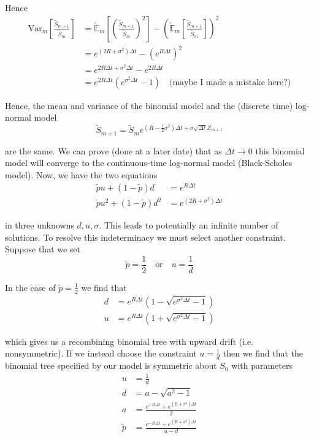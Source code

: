 \documentclass[12pt]{article}
\newlength\tindent
\renewcommand{\indent}{\hspace*{\tindent}}
\newcommand{\E}{\mathbb E}
\newcommand{\Var}{\mathrm{Var}}
\begin{document}
Hence
\begin{align*}
	\Var_m\left[ \frac{\tilde{S}_{m + 1}}{\tilde{S}_m} \right] &= \tilde{\E}_m \left[ \left( \frac{\tilde{S}_{m + 1}}{\tilde{S}_m} \right)^2 \right] - \left( \tilde{\E}_m \left[ \frac{\tilde{S}_{m + 1}}{\tilde{S}_m} \right] \right)^2 \\
	&= e^{(2R + \sigma^2)\Delta t} - \left(e^{R\Delta t}\right)^2 \\
	&= e^{2R\Delta t + \sigma^2\Delta t} - e^{2R\Delta t} \\
	&= e^{2R\Delta t}(e^{\sigma^2\Delta t} - 1) \quad \text{(maybe I made a mistake here?)}
\end{align*}

\indent Hence, the mean and variance of the binomial model and the (discrete time) log-normal model
\begin{equation*}
	\tilde{S}_{m + 1} = \tilde{S}_m e^{(R - \frac{1}{2}\sigma^2)\Delta t + \sigma\sqrt{\Delta t}Z_{m + 1}}
\end{equation*}

are the same. We can prove (done at a later date) that as $\Delta t\to 0$ this binomial model will converge to the continuous-time log-normal model (Black-Scholes model). Now, we have the two equations
\begin{align*}
	\tilde{p}u + (1 - \tilde{p})d &= e^{R\Delta t} \\
	\tilde{p}u^2 + (1 - \tilde{p})d^2 &= e^{(2R + \sigma^2)\Delta t}
\end{align*}

in three unknowns $d,u,\sigma$. This leads to potentially an infinite number of solutions. To resolve this indeterminacy we must select another constraint. Suppose that we set
\begin{equation*}
	\tilde{p} = \frac{1}{2} \quad \text{or} \quad u = \frac{1}{d}
\end{equation*}

In the case of $\tilde{p} = \frac{1}{2}$ we find that
\begin{align*}
	d &= e^{R\Delta t}\left(1 - \sqrt{e^{\sigma^2\Delta t} - 1}\right) \\
	u &= e^{R\Delta t}\left(1 + \sqrt{e^{\sigma^2\Delta t} - 1}\right)
\end{align*}

which gives us a recombining binomial tree with upward drift (i.e. nonsymmetric). If we instead choose the constraint $u = \frac{1}{d}$ then we find that the binomial tree specified by our model is symmetric about $S_0$ with parameters
\begin{align*}
	u &= \frac{1}{d} \\
	d &= a - \sqrt{a^2 - 1} \\
	a &= \frac{ e^{-R\Delta t} + e^{(R + \sigma^2)\Delta t} }{2} \\
	\tilde{p} &= \frac{ e^{-R\Delta t} + e^{(R + \sigma^2)\Delta t} }{u - d}
\end{align*}
\end{document}
